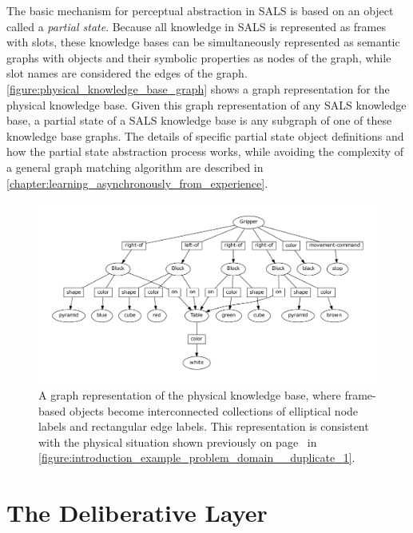 The basic mechanism for perceptual abstraction in SALS is based on an
object called a {\emph{partial state}}.  Because all knowledge in SALS
is represented as frames with slots, these knowledge bases can be
simultaneously represented as semantic graphs with objects and their
symbolic properties as nodes of the graph, while slot names are
considered the edges of the graph.
{\mbox{\autoref{figure:physical_knowledge_base_graph}}} shows a graph
representation for the physical knowledge base.  Given this graph
representation of any SALS knowledge base, a partial state of a SALS
knowledge base is any subgraph of one of these knowledge base graphs.
The details of specific partial state object definitions and how the
partial state abstraction process works, while avoiding the complexity
of a general graph matching algorithm are described in
{\mbox{\autoref{chapter:learning_asynchronously_from_experience}}}.
\begin{figure}
\centering
\includegraphics[width=14cm]{gfx/physical_knowledge_base_graph}
\caption[A graph representation of the physical knowledge base.]{A
  graph representation of the physical knowledge base, where
  frame-based objects become interconnected collections of elliptical
  node labels and rectangular edge labels.  This representation is
  consistent with the physical situation shown previously on
  {\mbox{page~\pageref{figure:introduction_example_problem_domain__duplicate_1}}}
  in
  {\mbox{\autoref{figure:introduction_example_problem_domain__duplicate_1}}}.}
\label{figure:physical_knowledge_base_graph}
\end{figure}

\section{The Deliberative Layer}
\label{section:the_deliberative_layer}

